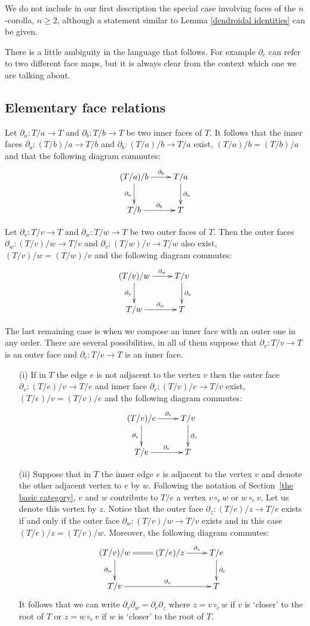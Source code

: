 \documentclass[a4paper]{amsart}
\theoremstyle{plain}
\theoremstyle{definition}
\theoremstyle{remark}
\newcommand{\To}{\longrightarrow}
\numberwithin{equation}{section}
\numberwithin{figure}{section}
\begin{document}
We do not include in our first description the special case involving faces of the $n$-corolla, $n\ge 2$, although a statement similar to Lemma \ref{dendroidal identities} can be given.

There is a little ambiguity in the language that follows. For example $\partial_e$
can refer to two different face maps, but it is always clear from the context which one we are talking about.


\subsection{Elementary face relations}
\label{faceface}
Let $\partial_a:T/a\To T$ and $\partial_b:T/b\To T$ be two inner faces of $T$. It follows that the inner
faces $\partial_a:(T/b)/a\To T/b$ and $\partial_b:(T/a)/b\To T/a$ exist, $(T/a)/b=(T/b)/a$ and that the following diagram
commutes:
$$\xymatrix{(T/a)/b\ar[r]^-{\partial_b}\ar[d]_-{\partial_a} &T/a\ar[d]^-{\partial_a}\\
    T/b\ar[r]^-{\partial_b} &T}$$

Let $\partial_v:T/v\To T$ and $\partial_w:T/w\To T$ be two outer faces of $T$. Then the outer faces
$\partial_w:(T/v)/w\To T/v$ and $\partial_v:(T/w)/v\To T/w$ also exist, $(T/v)/w=(T/w)/v$ and the following diagram
commutes:
$$\xymatrix{(T/v)/w\ar[r]^-{\partial_w}\ar[d]_-{\partial_v} & T/v\ar[d]^-{\partial_v}\\ T/w\ar[r]^-{\partial_w} &T}$$

The last remaining case is when we compose an inner face with an outer one in any order. There are several
possibilities, in all of them suppose that $\partial_v:T/v\To T$ is an outer face and $\partial_e:T/e\To T$ is an inner
face.
\begin{itemize}
    \item[{\rm (i)}] If in  $T$ the edge $e$ is not adjacent to the vertex $v$ then the outer face $\partial_v:(T/e)/v\To T/e$ and inner
          face $\partial_e:(T/v)/e\To T/v$ exist, $(T/e)/v=(T/v)/e$ and the following diagram commutes:
          $$\xymatrix{(T/v)/e\ar[r]^-{\partial_e}\ar[d]_-{\partial_v} &T/v\ar[d]^-{\partial_v}\\
              T/e\ar[r]^-{\partial_e} &T}$$
    \item[{\rm (ii)}] Suppose that in  $T$ the inner edge $e$ is adjacent to the vertex $v$  and denote the other adjacent vertex to $e$ by
          $w$. Following the notation of Section~\ref{the basic category}, $v$ and $w$ contribute to $T/e$ a vertex $v\circ_e w$ or
          $w\circ_e v$.
          Let us denote this vertex  by $z$. Notice that the outer face $\partial_z:(T/e)/z\To T/e$ exists if and only if the outer
          face $\partial_w:(T/v)/w\To T/v$ exists and in this case $(T/e)/z=(T/v)/w$. Moreover, the following diagram commutes:
          $$\xymatrix{(T/v)/w\ar@{=}[r]\ar[d]_-{\partial_w} &(T/e)/z\ar[r]^-{\partial_z} &T/e\ar[d]^-{\partial_e}\\
              T/v\ar[rr]^-{\partial_v} &&T}$$
          It follows that we can write $\partial_v\partial_w=\partial_e\partial_z$ where $z=v\circ_e w$ if $v$ is `closer' to the root
          of $T$ or $z=w\circ_e v$ if $w$ is `closer' to the root of $T$.
\end{itemize}
\end{document}
